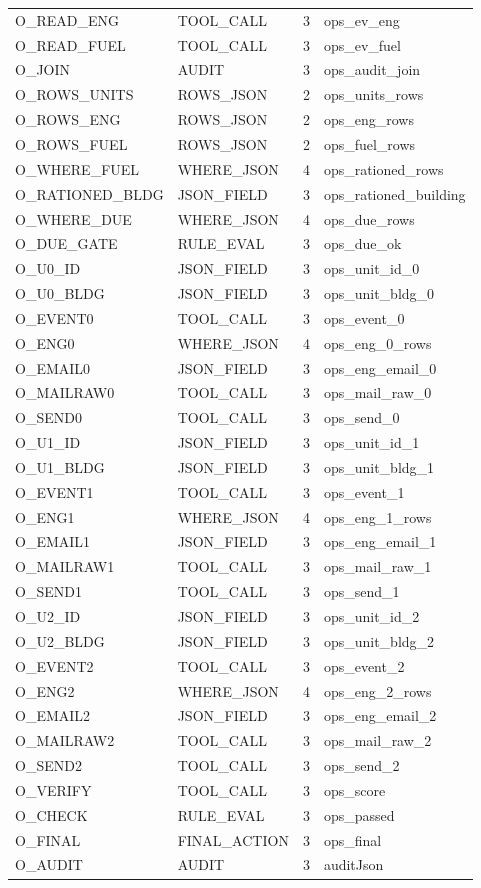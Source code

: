 {\begin{longtable}{p{5.0cm}p{3.1cm}p{1.0cm}p{5.0cm}}
O\_READ\_ENG & TOOL\_CALL & 3 & ops\_ev\_eng \\
O\_READ\_FUEL & TOOL\_CALL & 3 & ops\_ev\_fuel \\
O\_JOIN & AUDIT & 3 & ops\_audit\_join \\
O\_ROWS\_UNITS & ROWS\_JSON & 2 & ops\_units\_rows \\
O\_ROWS\_ENG & ROWS\_JSON & 2 & ops\_eng\_rows \\
O\_ROWS\_FUEL & ROWS\_JSON & 2 & ops\_fuel\_rows \\
O\_WHERE\_FUEL & WHERE\_JSON & 4 & ops\_rationed\_rows \\
O\_RATIONED\_BLDG & JSON\_FIELD & 3 & ops\_rationed\_building \\
O\_WHERE\_DUE & WHERE\_JSON & 4 & ops\_due\_rows \\
O\_DUE\_GATE & RULE\_EVAL & 3 & ops\_due\_ok \\
O\_U0\_ID & JSON\_FIELD & 3 & ops\_unit\_id\_0 \\
O\_U0\_BLDG & JSON\_FIELD & 3 & ops\_unit\_bldg\_0 \\
O\_EVENT0 & TOOL\_CALL & 3 & ops\_event\_0 \\
O\_ENG0 & WHERE\_JSON & 4 & ops\_eng\_0\_rows \\
O\_EMAIL0 & JSON\_FIELD & 3 & ops\_eng\_email\_0 \\
O\_MAILRAW0 & TOOL\_CALL & 3 & ops\_mail\_raw\_0 \\
O\_SEND0 & TOOL\_CALL & 3 & ops\_send\_0 \\
O\_U1\_ID & JSON\_FIELD & 3 & ops\_unit\_id\_1 \\
O\_U1\_BLDG & JSON\_FIELD & 3 & ops\_unit\_bldg\_1 \\
O\_EVENT1 & TOOL\_CALL & 3 & ops\_event\_1 \\
O\_ENG1 & WHERE\_JSON & 4 & ops\_eng\_1\_rows \\
O\_EMAIL1 & JSON\_FIELD & 3 & ops\_eng\_email\_1 \\
O\_MAILRAW1 & TOOL\_CALL & 3 & ops\_mail\_raw\_1 \\
O\_SEND1 & TOOL\_CALL & 3 & ops\_send\_1 \\
O\_U2\_ID & JSON\_FIELD & 3 & ops\_unit\_id\_2 \\
O\_U2\_BLDG & JSON\_FIELD & 3 & ops\_unit\_bldg\_2 \\
O\_EVENT2 & TOOL\_CALL & 3 & ops\_event\_2 \\
O\_ENG2 & WHERE\_JSON & 4 & ops\_eng\_2\_rows \\
O\_EMAIL2 & JSON\_FIELD & 3 & ops\_eng\_email\_2 \\
O\_MAILRAW2 & TOOL\_CALL & 3 & ops\_mail\_raw\_2 \\
O\_SEND2 & TOOL\_CALL & 3 & ops\_send\_2 \\
O\_VERIFY & TOOL\_CALL & 3 & ops\_score \\
O\_CHECK & RULE\_EVAL & 3 & ops\_passed \\
O\_FINAL & FINAL\_ACTION & 3 & ops\_final \\
O\_AUDIT & AUDIT & 3 & auditJson \\
\end{longtable}
}
